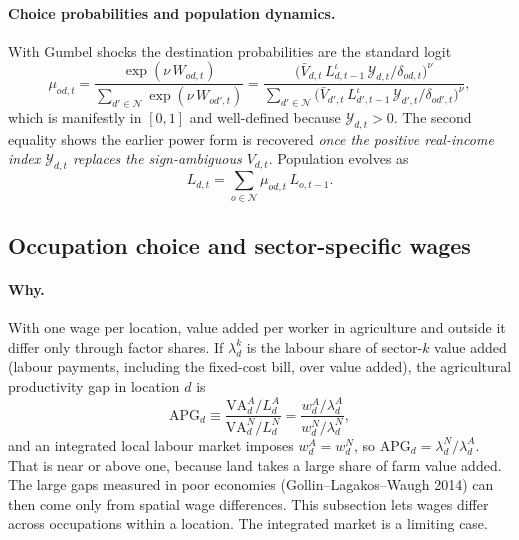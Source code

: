 \documentclass[11pt]{article}
\newcommand{\Nreg}{\mathcal{N}}
\begin{document}
\paragraph{Choice probabilities and population dynamics.} With Gumbel shocks the
destination probabilities are the standard logit
\begin{equation}
  \mu_{od,t}
  = \frac{\exp(\nu\, W_{od,t})}{\sum_{d'\in\Nreg}\exp(\nu\, W_{od',t})}
  = \frac{\bigl(\bar V_{d,t}\, L_{d,t-1}^{\iota}\, \mathcal{Y}_{d,t}/\delta_{od,t}\bigr)^{\nu}}
         {\sum_{d'\in\Nreg}\bigl(\bar V_{d',t}\, L_{d',t-1}^{\iota}\, \mathcal{Y}_{d',t}/\delta_{od',t}\bigr)^{\nu}},
  \label{eq:mu}
\end{equation}
which is manifestly in $[0,1]$ and well-defined because $\mathcal{Y}_{d,t}>0$. The second
equality shows the earlier power form is recovered \emph{once the positive real-income
index $\mathcal{Y}_{d,t}$ replaces the sign-ambiguous $V_{d,t}$}. Population evolves as
\begin{equation}
  L_{d,t} = \sum_{o \in \Nreg} \mu_{od,t}\, L_{o,t-1}.
\end{equation}

\subsection{Occupation choice and sector-specific wages}\label{sec:occupation}
\paragraph{Why.} With one wage per location, value added per worker in agriculture and
outside it differ only through factor shares. If $\lambda^{k}_{d}$ is the labour share of
sector-$k$ value added (labour payments, including the fixed-cost bill, over value added),
the agricultural productivity gap in location $d$ is
\begin{equation}
  \mathrm{APG}_{d}\equiv\frac{\mathrm{VA}^{A}_{d}/L^{A}_{d}}{\mathrm{VA}^{N}_{d}/L^{N}_{d}}
  =\frac{w^{A}_{d}/\lambda^{A}_{d}}{w^{N}_{d}/\lambda^{N}_{d}},
  \label{eq:apg}
\end{equation}
and an integrated local labour market imposes $w^{A}_{d}=w^{N}_{d}$, so
$\mathrm{APG}_{d}=\lambda^{N}_{d}/\lambda^{A}_{d}$. That is near or above one, because land
takes a large share of farm value added. The large gaps measured in poor economies
(Gollin--Lagakos--Waugh 2014) can then come only from spatial wage differences. This
subsection lets wages differ across occupations within a location. The integrated market is a
limiting case.
\end{document}
